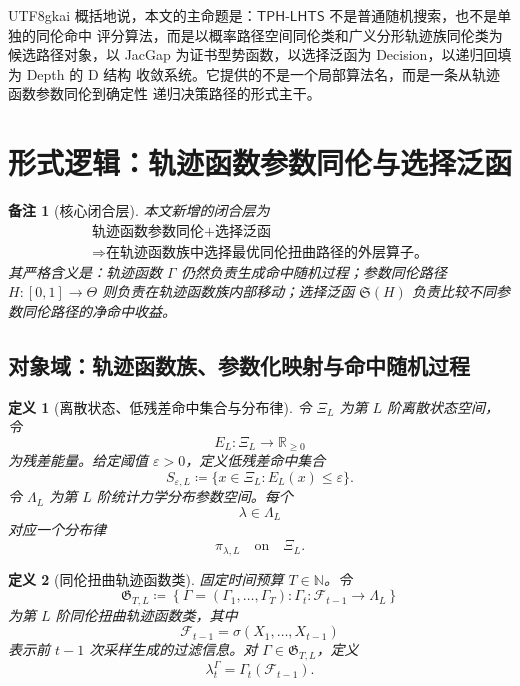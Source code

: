 \documentclass[12pt]{article}
\newtheorem{definition}{定义}[section]
\newtheorem{remark}{备注}[section]
\newcommand{\NN}{\mathbb{N}}
\newcommand{\RR}{\mathbb{R}}
\newcommand{\TPHLHTS}{\ensuremath{\mathsf{TPH\mbox{-}LHTS}}}
\newcommand{\DefEq}{\coloneqq}
\newcommand{\Fil}{\mathcal F}
\begin{document}
\begin{CJK*}{UTF8}{gkai}
概括地说，本文的主命题是：\(\TPHLHTS\) 不是普通随机搜索，也不是单独的同伦命中
评分算法，而是以概率路径空间同伦类和广义分形轨迹族同伦类为候选路径对象，以
JacGap 为证书型势函数，以选择泛函为 Decision，以递归回填为 Depth 的 D 结构
收敛系统。它提供的不是一个局部算法名，而是一条从轨迹函数参数同伦到确定性
递归决策路径的形式主干。

\setcounter{tocdepth}{3}
\setcounter{secnumdepth}{3}
\tableofcontents
\clearpage

\section{形式逻辑：轨迹函数参数同伦与选择泛函}
\label{sec:tex57-trajectory-parameter-homotopy}

\begin{remark}[核心闭合层]
本文新增的闭合层为
\[
\boxed{
\begin{gathered}
\text{轨迹函数参数同伦}
+
\text{选择泛函}\\
\Longrightarrow
\text{在轨迹函数族中选择最优同伦扭曲路径的外层算子。}
\end{gathered}
}
\]
其严格含义是：轨迹函数 \(\Gamma\) 仍然负责生成命中随机过程；参数同伦路径
\(H:[0,1]\to\Theta\) 则负责在轨迹函数族内部移动；选择泛函 \(\mathfrak S(H)\)
负责比较不同参数同伦路径的净命中收益。
\end{remark}

\subsection{对象域：轨迹函数族、参数化映射与命中随机过程}
\label{subsec:tex57-objects}

\begin{definition}[离散状态、低残差命中集合与分布律]
\label{def:tex57-state-hit-law}
令 \(\Xi_L\) 为第 \(L\) 阶离散状态空间，令
\[
  E_L:\Xi_L\to\RR_{\ge0}
\]
为残差能量。给定阈值 \(\varepsilon>0\)，定义低残差命中集合
\[
  S_{\varepsilon,L}
  \DefEq
  \{x\in\Xi_L:E_L(x)\le\varepsilon\}.
\]
令 \(\Lambda_L\) 为第 \(L\) 阶统计力学分布参数空间。每个
\[
  \lambda\in\Lambda_L
\]
对应一个分布律
\[
  \pi_{\lambda,L}
  \quad\text{on}\quad
  \Xi_L.
\]
\end{definition}

\begin{definition}[同伦扭曲轨迹函数类]
\label{def:tex57-trajectory-class}
固定时间预算 \(T\in\NN\)。令
\[
  \mathfrak G_{T,L}
  \DefEq
  \left\{
  \Gamma=(\Gamma_1,\ldots,\Gamma_T):
  \Gamma_t:\Fil_{t-1}\to\Lambda_L
  \right\}
\]
为第 \(L\) 阶同伦扭曲轨迹函数类，其中
\[
  \Fil_{t-1}
  =
  \sigma(X_1,\ldots,X_{t-1})
\]
表示前 \(t-1\) 次采样生成的过滤信息。对 \(\Gamma\in\mathfrak G_{T,L}\)，定义
\[
  \lambda_t^\Gamma
  =
  \Gamma_t(\Fil_{t-1}).
\]
\end{definition}


\end{CJK*}
\end{document}
